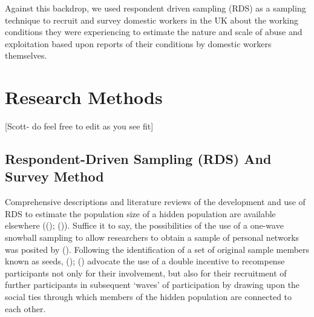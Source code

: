 \documentclass[
  12pt,
]{article}
\theoremstyle{plain}
\theoremstyle{definition}
\begin{document}
Against this backdrop, we used respondent driven sampling (RDS) as a
sampling technique to recruit and survey domestic workers in the UK
about the working conditions they were experiencing to estimate the
nature and scale of abuse and exploitation based upon reports of their
conditions by domestic workers themselves.

\section{Research Methods}\label{research-methods}

{[}Scott- do feel free to edit as you see fit{]}

\subsection{Respondent-Driven Sampling (RDS) And Survey
Method}\label{respondent-driven-sampling-rds-and-survey-method}

Comprehensive descriptions and literature reviews of the development and
use of RDS to estimate the population size of a hidden population are
available elsewhere
(();
()).
Suffice it to say, the possibilities of the use of a one-wave snowball
sampling to allow researchers to obtain a sample of personal networks
was posited by
().
Following the identification of a set of original sample members known
as seeds,
();
()
advocate the use of a double incentive to recompense participants not
only for their involvement, but also for their recruitment of further
participants in subsequent `waves' of participation by drawing upon the
social ties through which members of the hidden population are connected
to each other.
\end{document}
